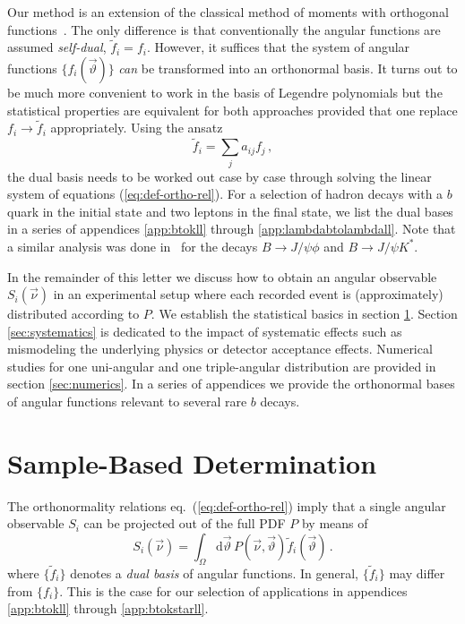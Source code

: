 \documentclass[aps,prd,reprint,nofootinbib,preprintnumbers]{revtex4}
\newcommand{\dual}[1]{\tilde{#1}}
\newcommand{\nuvec}{\vec{\nu}}
\newcommand{\refeq}[1]{eq.~(\ref{eq:#1})}
\newcommand{\rmdx}[1]{\mbox{d} #1 \,} %
\newcommand{\thvec}{\vec{\vartheta}}
\renewcommand{\theta}{\vartheta}
\begin{document}
Our method is an extension of the classical method of moments with
orthogonal functions~\cite[sec. 8.2]{James:2006zz}. The only difference
is that conventionally the angular functions are assumed
\emph{self-dual}, $\dual{f}_i = f_i$. However, it suffices that the
system of angular functions $\{f_i(\thvec)\}$ \emph{can} be transformed into
an orthonormal basis. It turns out to be much more convenient to work
in the basis of Legendre polynomials but the statistical properties
are equivalent for both approaches provided that one replace $f_i \to
\dual{f}_i$ appropriately. Using the ansatz
\begin{equation}
  \label{eq:dual-ansatz}
  \dual{f}_i = \sum_{j} a_{ij} f_j \,,
\end{equation}
the dual basis needs to be worked out case by case through solving the
linear system of equations (\ref{eq:def-ortho-rel}). For a selection
of hadron decays with a $b$ quark in the initial state and two leptons
in the final state, we list the dual bases in a series of appendices
\ref{app:btokll} through \ref{app:lambdabtolambdall}. Note that a
similar analysis was done in~\cite{Dighe:1998vk} for the decays $B \to
J/\psi \phi$ and $B \to J/\psi K^{*}$.

In the remainder of this letter we discuss how to obtain an angular
observable $S_i(\nuvec)$ in an experimental setup where each recorded
event is (approximately) distributed according to $P$.  We establish
the statistical basics in section \ref{sec:sample-based-det}. Section
\ref{sec:systematics} is dedicated to the impact of systematic effects
such as mismodeling the underlying physics or detector acceptance
effects. Numerical studies for one uni-angular and one triple-angular
distribution are provided in section \ref{sec:numerics}. In a series
of appendices we provide the orthonormal bases of angular functions
relevant to several rare $b$ decays.



\section{Sample-Based Determination}
\label{sec:sample-based-det}

The orthonormality relations \refeq{def-ortho-rel} imply that a single angular observable $S_i$
can be projected out of the full PDF $P$ by means of
\begin{equation}
    \label{eq:det-Pi-analytical}
    S_i(\nuvec) = \int_{\Omega} \rmdx{\vec\theta}  P(\nuvec, \thvec) \dual{f}_i(\thvec)\,.
\end{equation}
where $\lbrace \dual{f}_i \rbrace$ denotes a \emph{dual basis} of angular functions. In general, $\lbrace \dual{f}_i \rbrace$ may differ from $\lbrace f_i \rbrace$. This is the
case for our selection of applications in appendices \ref{app:btokll} through \ref{app:btokstarll}.\\
\end{document}

